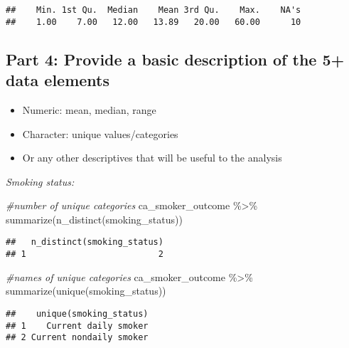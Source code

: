 \documentclass[
]{article}
\newenvironment{Shaded}{\begin{snugshade}}{\end{snugshade}}
\newcommand{\CommentTok}[1]{\textcolor[rgb]{0.56,0.35,0.01}{\textit{#1}}}
\newcommand{\FunctionTok}[1]{\textcolor[rgb]{0.00,0.00,0.00}{#1}}
\newcommand{\NormalTok}[1]{#1}
\newcommand{\SpecialCharTok}[1]{\textcolor[rgb]{0.00,0.00,0.00}{#1}}
\providecommand{\tightlist}{%
  \setlength{\itemsep}{0pt}\setlength{\parskip}{0pt}}
\begin{document}
\begin{verbatim}
##    Min. 1st Qu.  Median    Mean 3rd Qu.    Max.    NA's 
##    1.00    7.00   12.00   13.89   20.00   60.00      10
\end{verbatim}

\newpage

\hypertarget{part-4-provide-a-basic-description-of-the-5-data-elements}{%
\subsection{\texorpdfstring{Part 4: Provide a basic description of the
5+ data elements
\n}{Part 4: Provide a basic description of the 5+ data elements }}\label{part-4-provide-a-basic-description-of-the-5-data-elements}}

\begin{itemize}
\tightlist
\item
  Numeric: mean, median, range \n
\item
  Character: unique values/categories \n
\item
  Or any other descriptives that will be useful to the analysis \n
\end{itemize}

\emph{Smoking status:}

\begin{Shaded}
\begin{Highlighting}[]
\CommentTok{\#number of unique categories }
\NormalTok{ca\_smoker\_outcome }\SpecialCharTok{\%\textgreater{}\%} \FunctionTok{summarize}\NormalTok{(}\FunctionTok{n\_distinct}\NormalTok{(smoking\_status))}
\end{Highlighting}
\end{Shaded}

\begin{verbatim}
##   n_distinct(smoking_status)
## 1                          2
\end{verbatim}

\begin{Shaded}
\begin{Highlighting}[]
\CommentTok{\#names of unique categories }
\NormalTok{ca\_smoker\_outcome }\SpecialCharTok{\%\textgreater{}\%} \FunctionTok{summarize}\NormalTok{(}\FunctionTok{unique}\NormalTok{(smoking\_status))}
\end{Highlighting}
\end{Shaded}

\begin{verbatim}
##    unique(smoking_status)
## 1    Current daily smoker
## 2 Current nondaily smoker
\end{verbatim}
\end{document}
